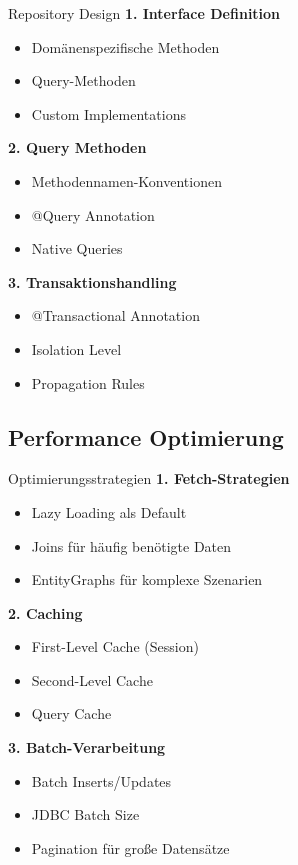 \begin{KR}{Repository Design}
\textbf{1. Interface Definition}
\begin{itemize}
    \item Domänenspezifische Methoden
    \item Query-Methoden
    \item Custom Implementations
\end{itemize}

\textbf{2. Query Methoden}
\begin{itemize}
    \item Methodennamen-Konventionen
    \item @Query Annotation
    \item Native Queries
\end{itemize}

\textbf{3. Transaktionshandling}
\begin{itemize}
    \item @Transactional Annotation
    \item Isolation Level
    \item Propagation Rules
\end{itemize}
\end{KR}

\subsection{Performance Optimierung}

\begin{KR}{Optimierungsstrategien}
\textbf{1. Fetch-Strategien}
\begin{itemize}
    \item Lazy Loading als Default
    \item Joins für häufig benötigte Daten
    \item EntityGraphs für komplexe Szenarien
\end{itemize}

\textbf{2. Caching}
\begin{itemize}
    \item First-Level Cache (Session)
    \item Second-Level Cache
    \item Query Cache
\end{itemize}

\textbf{3. Batch-Verarbeitung}
\begin{itemize}
    \item Batch Inserts/Updates
    \item JDBC Batch Size
    \item Pagination für große Datensätze
\end{itemize}
\end{KR}

